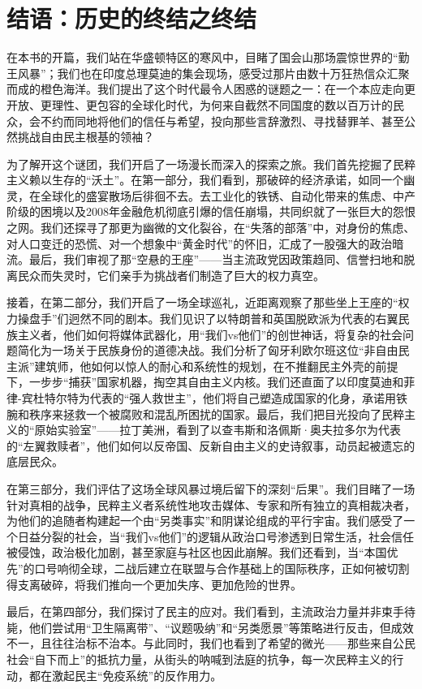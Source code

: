\chapter{结语：历史的终结之终结}

在本书的开篇，我们站在华盛顿特区的寒风中，目睹了国会山那场震惊世界的“勤王风暴”；我们也在印度总理莫迪的集会现场，感受过那片由数十万狂热信众汇聚而成的橙色海洋。我们提出了这个时代最令人困惑的谜题之一：在一个本应走向更开放、更理性、更包容的全球化时代，为何来自截然不同国度的数以百万计的民众，会不约而同地将他们的信任与希望，投向那些言辞激烈、寻找替罪羊、甚至公然挑战自由民主根基的领袖？

为了解开这个谜团，我们开启了一场漫长而深入的探索之旅。我们首先挖掘了民粹主义赖以生存的“沃土”。在第一部分，我们看到，那破碎的经济承诺，如同一个幽灵，在全球化的盛宴散场后徘徊不去。去工业化的铁锈、自动化带来的焦虑、中产阶级的困境以及2008年金融危机彻底引爆的信任崩塌，共同织就了一张巨大的怨恨之网。我们还探寻了那更为幽微的文化裂谷，在“失落的部落”中，对身份的焦虑、对人口变迁的恐慌、对一个想象中“黄金时代”的怀旧，汇成了一股强大的政治暗流。最后，我们审视了那“空悬的王座”——当主流政党因政策趋同、信誉扫地和脱离民众而失灵时，它们亲手为挑战者们制造了巨大的权力真空。

接着，在第二部分，我们开启了一场全球巡礼，近距离观察了那些坐上王座的“权力操盘手”们迥然不同的剧本。我们见识了以特朗普和英国脱欧派为代表的右翼民族主义者，他们如何将媒体武器化，用“我们vs他们”的创世神话，将复杂的社会问题简化为一场关于民族身份的道德决战。我们分析了匈牙利欧尔班这位“非自由民主派”建筑师，他如何以惊人的耐心和系统性的规划，在不推翻民主外壳的前提下，一步步“捕获”国家机器，掏空其自由主义内核。我们还直面了以印度莫迪和菲律-宾杜特尔特为代表的“强人救世主”，他们将自己塑造成国家的化身，承诺用铁腕和秩序来拯救一个被腐败和混乱所困扰的国家。最后，我们把目光投向了民粹主义的“原始实验室”——拉丁美洲，看到了以查韦斯和洛佩斯·奥夫拉多尔为代表的“左翼救赎者”，他们如何以反帝国、反新自由主义的史诗叙事，动员起被遗忘的底层民众。

在第三部分，我们评估了这场全球风暴过境后留下的深刻“后果”。我们目睹了一场针对真相的战争，民粹主义者系统性地攻击媒体、专家和所有独立的真相裁决者，为他们的追随者构建起一个由“另类事实”和阴谋论组成的平行宇宙。我们感受了一个日益分裂的社会，当“我们vs他们”的逻辑从政治口号渗透到日常生活，社会信任被侵蚀，政治极化加剧，甚至家庭与社区也因此崩解。我们还看到，当“本国优先”的口号响彻全球，二战后建立在联盟与合作基础上的国际秩序，正如何被切割得支离破碎，将我们推向一个更加失序、更加危险的世界。

最后，在第四部分，我们探讨了民主的应对。我们看到，主流政治力量并非束手待毙，他们尝试用“卫生隔离带”、“议题吸纳”和“另类愿景”等策略进行反击，但成效不一，且往往治标不治本。与此同时，我们也看到了希望的微光——那些来自公民社会“自下而上”的抵抗力量，从街头的呐喊到法庭的抗争，每一次民粹主义的行动，都在激起民主“免疫系统”的反作用力。

